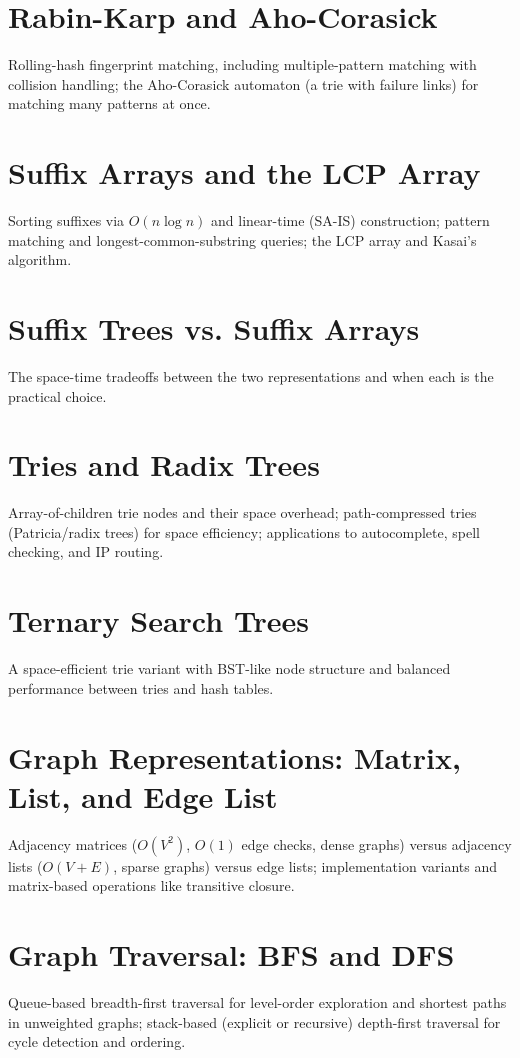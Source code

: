 \chapter{Rabin-Karp and Aho-Corasick}
Rolling-hash fingerprint matching, including multiple-pattern matching with collision handling; the Aho-Corasick automaton (a trie with failure links) for matching many patterns at once.

\chapter{Suffix Arrays and the LCP Array}
Sorting suffixes via $O(n \log n)$ and linear-time (SA-IS) construction; pattern matching and longest-common-substring queries; the LCP array and Kasai's algorithm.

\chapter{Suffix Trees vs. Suffix Arrays}
The space-time tradeoffs between the two representations and when each is the practical choice.

\chapter{Tries and Radix Trees}
Array-of-children trie nodes and their space overhead; path-compressed tries (Patricia/radix trees) for space efficiency; applications to autocomplete, spell checking, and IP routing.

\chapter{Ternary Search Trees}
A space-efficient trie variant with BST-like node structure and balanced performance between tries and hash tables.

\chapter{Graph Representations: Matrix, List, and Edge List}
Adjacency matrices ($O(V^2)$, $O(1)$ edge checks, dense graphs) versus adjacency lists ($O(V+E)$, sparse graphs) versus edge lists; implementation variants and matrix-based operations like transitive closure.

\chapter{Graph Traversal: BFS and DFS}
Queue-based breadth-first traversal for level-order exploration and shortest paths in unweighted graphs; stack-based (explicit or recursive) depth-first traversal for cycle detection and ordering.

